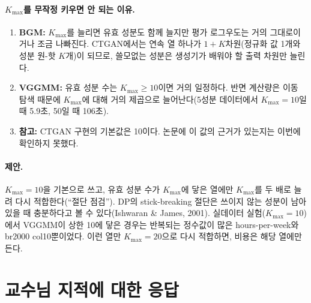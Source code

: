 \documentclass[11pt]{article}
\begin{document}
\paragraph{$K_{\max}$를 무작정 키우면 안 되는 이유.}
\begin{enumerate}
  \item \textbf{BGM:} $K_{\max}$를 늘리면 유효 성분도 함께 늘지만 평가 로그우도는 거의 그대로이거나 조금 나빠진다. CTGAN에서는 연속 열 하나가 $1+K$차원(정규화 값 1개와 성분 원-핫 $K$개)이 되므로, 쓸모없는 성분은 생성기가 배워야 할 출력 차원만 늘린다.
  \item \textbf{VGGMM:} 유효 성분 수는 $K_{\max}\ge10$이면 거의 일정하다. 반면 계산량은 이동 탐색 때문에 $K_{\max}$에 대해 거의 제곱으로 늘어난다(5성분 데이터에서 $K_{\max}=10$일 때 5.9초, 50일 때 106초).
  \item \textbf{참고:} CTGAN 구현의 기본값은 10이다. 논문에 이 값의 근거가 있는지는 이번에 확인하지 못했다.
\end{enumerate}

\paragraph{제안.}
$K_{\max}=10$을 기본으로 쓰고, 유효 성분 수가 $K_{\max}$에 닿은 열에만 $K_{\max}$를 두 배로 늘려 다시 적합한다(``절단 점검'').
DP의 stick-breaking 절단은 쓰이지 않는 성분이 남아 있을 때 충분하다고 볼 수 있다(Ishwaran \& James, 2001). 실데이터 실험($K_{\max}=10$)에서 VGGMM이 상한 10에 닿은 경우는 반복되는 정수값이 많은 hours-per-week와 br2000 col10뿐이었다. 이런 열만 $K_{\max}=20$으로 다시 적합하면, 비용은 해당 열에만 든다.

\section{교수님 지적에 대한 응답}
\end{document}
